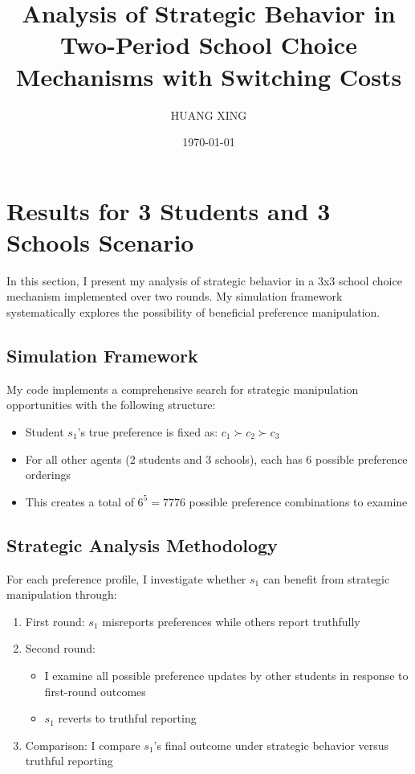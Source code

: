 \documentclass{article}
\title{Analysis of Strategic Behavior in Two-Period School Choice Mechanisms with Switching Costs}
\author{HUANG XING}
\date{\today}
\begin{document}
\maketitle

\section{Results for 3 Students and 3 Schools Scenario}

In this section, I present my analysis of strategic behavior in a 3x3 school choice mechanism implemented over two rounds. My simulation framework systematically explores the possibility of beneficial preference manipulation.

\subsection{Simulation Framework}
My code implements a comprehensive search for strategic manipulation opportunities with the following structure:
\begin{itemize}
    \item Student $s_1$'s true preference is fixed as: $c_1 \succ c_2 \succ c_3 $
    \item For all other agents (2 students and 3 schools), each has 6 possible preference orderings
    \item This creates a total of $6^5=7776$ possible preference combinations to examine
\end{itemize}

\subsection{Strategic Analysis Methodology}
For each preference profile, I investigate whether $s_1$ can benefit from strategic manipulation through:
\begin{enumerate}
    \item First round: $s_1$ misreports preferences while others report truthfully
    \item Second round: 
        \begin{itemize}
            \item I examine all possible preference updates by other students in response to first-round outcomes
            \item $s_1$ reverts to truthful reporting
        \end{itemize}
    \item Comparison: I compare $s_1$'s final outcome under strategic behavior versus truthful reporting
\end{enumerate}
\end{document}
